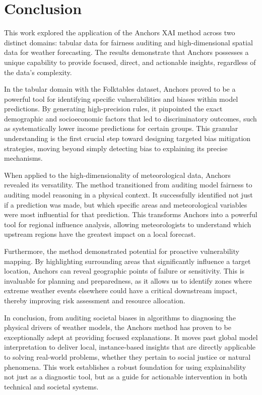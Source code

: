 \section{Conclusion}
This work explored the application of the Anchors XAI method across two distinct domains: tabular data for fairness auditing and high-dimensional spatial data for weather forecasting. The results demonstrate that Anchors possesses a unique capability to provide focused, direct, and actionable insights, regardless of the data's complexity.

In the tabular domain with the Folktables dataset, Anchors proved to be a powerful tool for identifying specific vulnerabilities and biases within model predictions. By generating high-precision rules, it pinpointed the exact demographic and socioeconomic factors that led to discriminatory outcomes, such as systematically lower income predictions for certain groups. This granular understanding is the first crucial step toward designing targeted bias mitigation strategies, moving beyond simply detecting bias to explaining its precise mechanisms.

When applied to the high-dimensionality of meteorological data, Anchors revealed its versatility. The method transitioned from auditing model fairness to auditing model reasoning in a physical context. It successfully identified not just if a prediction was made, but which specific areas and meteorological variables were most influential for that prediction. This transforms Anchors into a powerful tool for regional influence analysis, allowing meteorologists to understand which upstream regions have the greatest impact on a local forecast.

Furthermore, the method demonstrated potential for proactive vulnerability mapping. By highlighting surrounding areas that significantly influence a target location, Anchors can reveal geographic points of failure or sensitivity. This is invaluable for planning and preparedness, as it allows us to identify zones where extreme weather events elsewhere could have a critical downstream impact, thereby improving risk assessment and resource allocation.

In conclusion, from auditing societal biases in algorithms to diagnosing the physical drivers of weather models, the Anchors method has proven to be exceptionally adept at providing focused explanations. It moves past global model interpretation to deliver local, instance-based insights that are directly applicable to solving real-world problems, whether they pertain to social justice or natural phenomena. This work establishes a robust foundation for using explainability not just as a diagnostic tool, but as a guide for actionable intervention in both technical and societal systems.